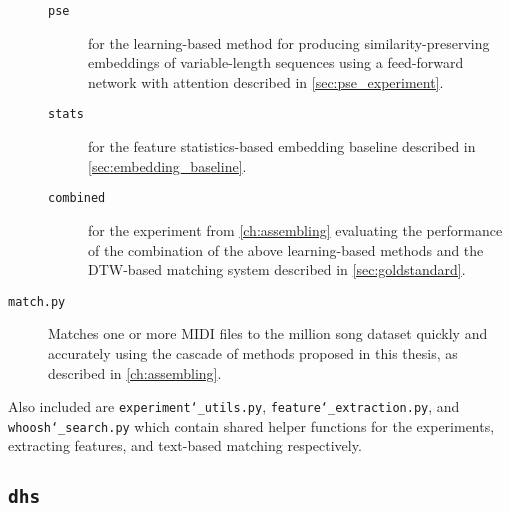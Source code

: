 \begin{description}
\begin{description}
\item[\texttt{pse}] for the learning-based method for producing similarity-preserving embeddings of variable-length sequences using a feed-forward network with attention described in \cref{sec:pse_experiment}.
\item[\texttt{stats}] for the feature statistics-based embedding baseline described in \cref{sec:embedding_baseline}.
\item[\texttt{combined}] for the experiment from \cref{ch:assembling} evaluating the performance of the combination of the above learning-based methods and the DTW-based matching system described in \cref{sec:goldstandard}.
\end{description}
\item[\texttt{match.py}] Matches one or more MIDI files to the million song dataset quickly and accurately using the cascade of methods proposed in this thesis, as described in \cref{ch:assembling}.
\end{description}

Also included are \texttt{experiment\char`_utils.py}, \texttt{feature\char`_extraction.py}, and \texttt{whoosh\char`_search.py} which contain shared helper functions for the experiments, extracting features, and text-based matching respectively.

\subsection{\texttt{dhs}}

